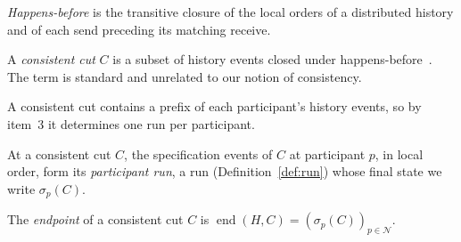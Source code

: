 \begin{definition}
\label{def:happens-before}
\emph{Happens-before} is the transitive closure of the local orders of a
distributed history and of each send preceding its matching receive.
\end{definition}

\begin{definition}
\label{def:consistent-cut}
A \emph{consistent cut} $C$ is a subset of history events closed under happens-before~\cite{lamport1978time,chandy1985distributed}.  The term is standard and unrelated to our notion of consistency.
\end{definition}

A consistent cut contains a prefix of each participant's history events, so by
item~3
it determines one run per participant.

\begin{definition}
\label{def:participant-run}
At a consistent cut $C$, the specification events of $C$ at participant $p$,
in local order, form its \emph{participant run}, a run
(Definition~\ref{def:run}) whose final state we write $\sigma_p(C)$.
\end{definition}

\begin{definition}[Endpoint]
\label{def:endpoint}
The \emph{endpoint} of a consistent cut $C$ is
$\operatorname{end}(H,C)=(\sigma_p(C))_{p\in\mathcal N}$.
\end{definition}

